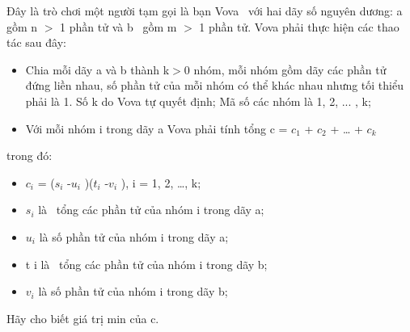 Đây là trò chơi một người tạm gọi là bạn Vova  với hai dãy số nguyên dương: a gồm n $>$ 1 phần tử và b  gồm m $>$ 1 phần tử. Vova phải thực hiện các thao tác sau đây:
\begin{itemize}
	\item Chia mỗi dãy a và b thành k$>$0 nhóm, mỗi nhóm gồm dãy các phần tử đứng liền nhau, số phần tử của mỗi nhóm có thể khác nhau nhưng tối thiểu phải là 1. Số k do Vova tự quyết định; Mã số các nhóm là 1, 2, ... , k;
	\item Với mỗi nhóm i trong dãy a Vova phải tính tổng c = $c_{1}$ + $c_{2}$ + … + $c_{k}$
\end{itemize}

trong đó:
\begin{itemize}
	\item $c_{i}$ = ($s_{i}$ -$u_{i}$ )($t_{i}$ -$v_{i}$ ), i = 1, 2, …, k;
	\item $s_{i}$ là  tổng các phần tử của nhóm i trong dãy a;
	\item $u_{i}$ là số phần tử của nhóm i trong dãy a;
	\item t i là  tổng các phần tử của nhóm i trong dãy b;
	\item $v_{i}$ là số phần tử của nhóm i trong dãy b;
\end{itemize}

Hãy cho biết giá trị min của c.